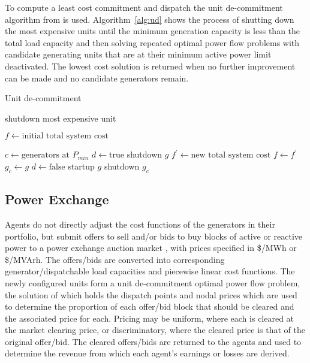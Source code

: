 To compute a least cost commitment and dispatch the unit de-commitment algorithm from
 is used.  Algorithm~\ref{alg:ud} shows the
process of shutting down the most expensive units until the minimum generation
capacity is less than the total load capacity and then solving repeated
optimal power flow problems with candidate generating units that are at their
minimum active power limit deactivated.  The lowest cost solution is returned
when no further improvement can be made and no candidate generators remain.
\begin{algorithm}%
\caption{Unit de-commitment}
\label{alg:ud}
\begin{algorithmic}[1]
	\STATE shutdown most expensive unit
\ENDWHILE

\STATE $f \leftarrow \text{initial total system cost}$

\REPEAT
	\STATE $c \leftarrow \text{generators at } P_{min}$
		\STATE $d \leftarrow \text{true}$
		\STATE shutdown $g$
		\STATE $f^\prime \leftarrow \text{new total system cost}$
			\STATE $f \leftarrow f^\prime$
			\STATE $g_{c} \leftarrow g$
			\STATE $d \leftarrow \text{false}$
		\ENDIF
		\STATE startup $g$
	\ENDFOR
	\STATE shutdown $g_c$
\end{algorithmic}
\end{algorithm}

\subsection{Power Exchange}
Agents do not directly adjust the cost functions of the
generators in their portfolio, but submit offers to sell and/or bids to buy
blocks of active or reactive power to a power exchange auction market
\cite[p.92]{pserc:mp_manual}, with prices specified in \$/MWh or  \$/MVArh.
The offers/bids are converted into corresponding generator/dispatchable load
capacities and piecewise linear cost functions.  The newly configured
units form a unit de-commitment optimal power flow problem, the solution
of which holds the dispatch points and nodal prices which are used to
determine the proportion of each offer/bid block that should be cleared and
the associated price for each.  Pricing may be uniform, where each is cleared
at the market clearing price, or discriminatory, where the cleared price is
that of the original offer/bid.  The cleared offers/bids are returned to the
agents and used to determine the revenue from which each agent's earnings or
losses are derived.

